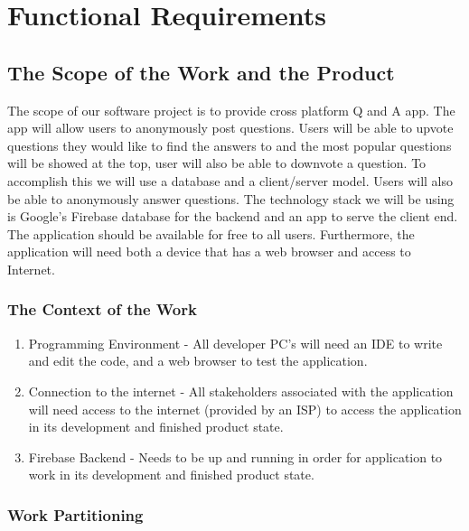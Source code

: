 \documentclass[12pt, titlepage]{article}
\begin{document}
\section{Functional Requirements}

\subsection{The Scope of the Work and the Product}

The scope of our software project is to provide cross platform Q and A app. The app will allow users to anonymously post questions. Users will be able to upvote questions they would like to find the answers to and the most popular questions will be showed at the top, user will also be able to downvote a question. To accomplish this we will use a database and a client/server model. Users will also be able to anonymously answer questions. The technology stack we will be using is Google’s Firebase database for the backend and an app to serve the client end. The application should be available for free to all users. Furthermore, the application will need both a device that has a web browser and access to Internet. 

\subsubsection{The Context of the Work}

\begin{enumerate}
  \item Programming Environment - All developer PC’s will need an IDE to write and edit the code, and a web browser to test the application.
  \item Connection to the internet - All stakeholders associated with the application will need access to the internet (provided by an ISP) to access the application in its development and finished product state.
  \item Firebase Backend - Needs to be up and running in order for application to work in its development and finished product state.
\end{enumerate}

\subsubsection{Work Partitioning}
\end{document}
